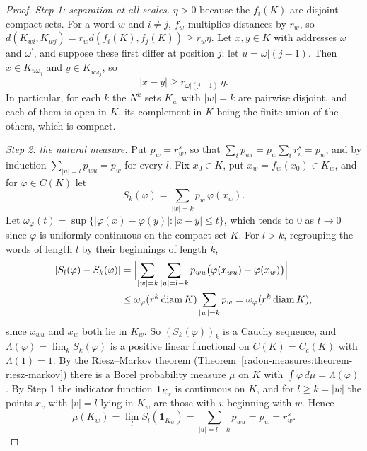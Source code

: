 \begin{proof}
\emph{Step 1: separation at all scales.} $\eta > 0$ because the $f_i(K)$ are disjoint compact sets. For a word $w$ and $i \neq j$, $f_w$ multiplies distances by $r_w$, so
$d(K_{wi}, K_{wj}) = r_wd(f_i(K), f_j(K)) \geq r_w\eta$. Let $x, y \in K$ with addresses $\omega$ and $\omega^{\prime}$, and suppose these first differ at position $j$; let $u = \omega|(j - 1)$. Then
$x \in K_{u\omega_j}$ and $y \in K_{u\omega^{\prime}_j}$, so
\begin{equation}\label{geometric-measure-theory:equation-separation}
|x - y| \geq r_{\omega|(j - 1)}\,\eta .
\end{equation}
In particular, for each $k$ the $N^k$ sets $K_w$ with $|w| = k$ are pairwise disjoint, and each of them is open in $K$, its complement in $K$ being the finite union of the others, which is compact.

\emph{Step 2: the natural measure.} Put $p_w = r_w^s$, so that $\sum_ip_{wi} = p_w\sum_ir_i^s = p_w$, and by induction $\sum_{|u| = l}p_{wu} = p_w$ for every $l$. Fix $x_0 \in K$, put
$x_w = f_w(x_0) \in K_w$, and for $\varphi \in C(K)$ let
\[
S_k(\varphi) = \sum_{|w| = k}p_w\,\varphi(x_w) .
\]
Let $\omega_\varphi(t) = \sup\{|\varphi(x) - \varphi(y)| : |x - y| \leq t\}$, which tends to $0$ as $t \to 0$ since $\varphi$ is uniformly continuous on the compact set $K$. For $l > k$, regrouping the words of
length $l$ by their beginnings of length $k$,
\[\begin{aligned}
|S_l(\varphi) - S_k(\varphi)| &= \Bigl|\sum_{|w| = k}\sum_{|u| = l - k}p_{wu}\bigl(\varphi(x_{wu}) - \varphi(x_w)\bigr)\Bigr| \\
&\leq \omega_\varphi(r^k\operatorname{diam}K)\sum_{|w| = k}p_w = \omega_\varphi(r^k\operatorname{diam}K),
\end{aligned}\]
since $x_{wu}$ and $x_w$ both lie in $K_w$. So $(S_k(\varphi))_k$ is a Cauchy sequence, and $\Lambda(\varphi) = \lim_kS_k(\varphi)$ is a positive linear functional on $C(K) = C_c(K)$ with $\Lambda(1) = 1$. By the
Riesz--Markov theorem (Theorem~\ref{radon-measures:theorem-riesz-markov}) there is a Borel probability measure $\mu$ on $K$ with $\int\varphi\,d\mu = \Lambda(\varphi)$. By Step 1 the indicator
function $\mathbf{1}_{K_w}$ is continuous on $K$, and for $l \geq k = |w|$ the points $x_v$ with $|v| = l$ lying in $K_w$ are those with $v$ beginning with $w$. Hence
\[
\mu(K_w) = \lim_lS_l(\mathbf{1}_{K_w}) = \sum_{|u| = l - k}p_{wu} = p_w = r_w^s .
\]


\end{proof}
